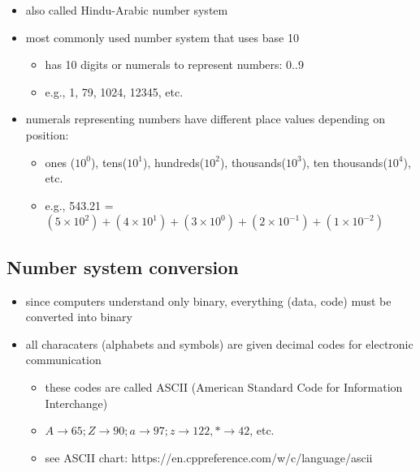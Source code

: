 \documentclass[11pt]{article}
\providecommand{\tightlist}{%
      \setlength{\itemsep}{0pt}\setlength{\parskip}{0pt}}
\begin{document}
\begin{itemize}
\tightlist
\item
  also called Hindu-Arabic number system
\item
  most commonly used number system that uses base 10

  \begin{itemize}
  \tightlist
  \item
    has 10 digits or numerals to represent numbers: 0..9
  \item
    e.g., 1, 79, 1024, 12345, etc.
  \end{itemize}
\item
  numerals representing numbers have different place values depending on
  position:

  \begin{itemize}
  \tightlist
  \item
    ones (\(10^0\)), tens(\(10^1\)), hundreds(\(10^2\)),
    thousands(\(10^3\)), ten thousands(\(10^4\)), etc.
  \item
    e.g., 543.21 =
    \((5\times10^2)+(4\times10^1)+(3\times10^0)+(2\times10^{-1})+(1\times10^{-2})\)
  \end{itemize}
\end{itemize}

\hypertarget{number-system-conversion}{%
\subsection{Number system conversion}\label{number-system-conversion}}

\begin{itemize}
\tightlist
\item
  since computers understand only binary, everything (data, code) must
  be converted into binary
\item
  all characaters (alphabets and symbols) are given decimal codes for
  electronic communication

  \begin{itemize}
  \tightlist
  \item
    these codes are called ASCII (American Standard Code for Information
    Interchange)
  \item
    \(A \rightarrow 65; Z \rightarrow 90; a \rightarrow 97; z \rightarrow 122, * \rightarrow 42\),
    etc.
  \item
    see ASCII chart: https://en.cppreference.com/w/c/language/ascii
  \end{itemize}
\end{itemize}
\end{document}
